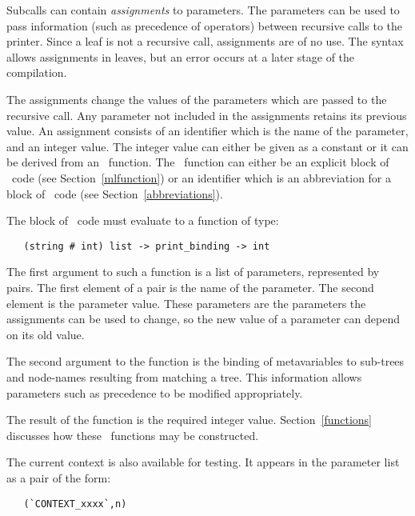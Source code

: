 Subcalls can contain {\it assignments\/} to parameters. The parameters can be
used to pass information (such as precedence of operators) between recursive
calls to the printer. Since a leaf is not a recursive call, assignments are of
no use. The syntax allows assignments in leaves, but an error occurs at a later
stage of the compilation.

The assignments change the values of the parameters which are passed to the
recursive call. Any parameter not included in the assignments retains its
previous value. An assignment consists of an identifier which is the name of
the parameter, and an integer value. The integer value can either be given as
a constant or it can be derived from an \ML\ function. The \ML\ function can
either be an explicit block of \ML\ code (see Section~\ref{mlfunction}) or an
identifier which is an abbreviation for a block of \ML\ code (see
Section~\ref{abbreviations}).

The block of \ML\ code must evaluate to a function of type:

\begin{small}\begin{verbatim}
   (string # int) list -> print_binding -> int
\end{verbatim}\end{small}

\noindent
The first argument to such a function is a list of parameters, represented by
pairs. The first element of a pair is the name of the parameter. The second
element is the parameter value. These parameters are the parameters the
assignments can be used to change, so the new value of a parameter can depend
on its old value.

The second argument to the function is the binding of metavariables to
sub-trees and node-names resulting from matching a tree. This information
allows parameters such as precedence to be modified appropriately.

The result of the function is the required integer value.
Section~\ref{functions} discusses how these \ML\ functions may be constructed.

The current context is also available for testing. It appears in the parameter
list as a pair of the form:

\begin{small}\begin{verbatim}
   (`CONTEXT_xxxx`,n)
\end{verbatim}\end{small}

